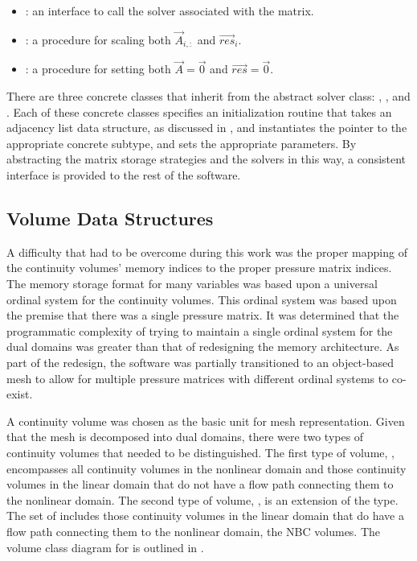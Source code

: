 \begin{itemize}
\item{ : an interface to call the solver associated with the matrix.}
\item{ : a procedure for scaling both $\vec{A}_{i, :}$ and $\vec{res}_{i}$.}
\item{ : a procedure for setting both $\vec{A} = \vec{0}$ and $\vec{res} = \vec{0}$.}
\end{itemize}

There are three concrete classes that inherit from the abstract solver class: , , and .
Each of these concrete classes specifies an initialization routine that takes an adjacency list data structure, as discussed in , and instantiates the  pointer to the appropriate concrete subtype, and sets the appropriate parameters.
By abstracting the matrix storage strategies and the solvers in this way, a consistent interface is provided to the rest of the software.

\subsection{Volume Data Structures}
\label{subsect:domDecompVolumeStructs}

A difficulty that had to be overcome during this work was the proper mapping of the continuity volumes' memory indices to the proper pressure matrix indices.
The memory storage format for many variables was based upon a universal ordinal system for the continuity volumes.
This ordinal system was based upon the premise that there was a single pressure matrix.
It was determined that the programmatic complexity of trying to maintain a single ordinal system for the dual domains was greater than that of redesigning the memory architecture.
As part of the redesign, the software was partially transitioned to an object-based mesh to allow for multiple pressure matrices with different ordinal systems to co-exist.

A continuity volume was chosen as the basic unit for mesh representation.
Given that the mesh is decomposed into dual domains, there were two types of continuity volumes that needed to be distinguished.
The first type of volume, , encompasses all continuity volumes in the nonlinear domain and those continuity volumes in the linear domain that do not have a flow path connecting them to the nonlinear domain.
The second type of volume, , is an extension of the  type.
The set of  includes those continuity volumes in the linear domain that do have a flow path connecting them to the nonlinear domain, the NBC volumes.
The volume class diagram for \cobra{} is outlined in .

